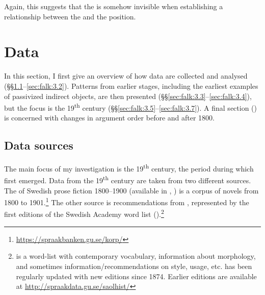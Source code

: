 \documentclass[output=paper]{langscibook}
\begin{document}
\ea%
    \label{ex:falk:7}

\z
\z

Again, this suggests that the  is somehow invisible when establishing a relationship between the  and the  position.

\section{Data}\label{sec:falk:3}


In this section, I first give an overview of how data are collected and analysed (§§\ref{sec:falk:3.1}--\ref{sec:falk:3.2}). Patterns from earlier stages, including the earliest examples of passivized indirect objects, are then presented (§§\ref{sec:falk:3.3}--\ref{sec:falk:3.4}), but the focus is the 19\textsuperscript{th} century (§§\ref{sec:falk:3.5}--\ref{sec:falk:3.7}). A final section () is concerned with changes in argument order before and after 1800.

\subsection{Data sources}
\label{sec:falk:3.1}

The main focus of my investigation is the 19\textsuperscript{th} century, the period during which  first emerged. Data from the 19\textsuperscript{th} century are taken from two different sources. The  of Swedish prose fiction 1800–1900 (available in , \citealt{BorinEtAl2012}) is a corpus of novels from 1800 to 1901.\footnote{\url{https://spraakbanken.gu.se/korp/}}  The other source is recommendations from , represented by the first editions of the Swedish Academy word list ().\footnote{ is a word-list with contemporary vocabulary, information about morphology, and sometimes information/recommendations on style, usage, etc.  has been regularly updated with new editions since 1874. Earlier editions are available at \url{http://spraakdata.gu.se/saolhist/}{} }
\end{document}
